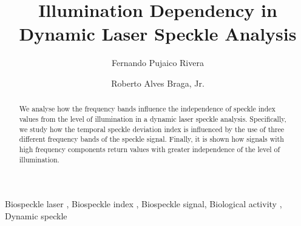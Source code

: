\documentclass[review]{elsarticle}
\begin{document}
 

\begin{frontmatter}

\title{Illumination Dependency in Dynamic Laser Speckle Analysis}

\author{Fernando Pujaico Rivera}
\author{Roberto Alves Braga, Jr.}

\address{Federal University of Lavras, Lavras, Brazil}

\begin{abstract}
We analyse how the frequency bands 
influence the independence 
of speckle index values from the level of illumination
in a dynamic laser speckle analysis.
Specifically, 
we study how the temporal speckle deviation 
index is influenced by the use of three different frequency bands of the speckle signal.
Finally, it is shown how signals with high frequency components return values with greater independence of the level of illumination.
\end{abstract}

\begin{keyword}
Biospeckle laser \sep 
Biospeckle index \sep 
Biospeckle signal\sep 
Biological activity \sep
Dynamic speckle 
\end{keyword}

\end{frontmatter}

\linenumbers
\end{document}
